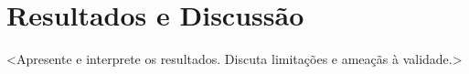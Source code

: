 \section{Resultados e Discuss\~ao}
\label{sec:resultados}

<Apresente e interprete os resultados. Discuta limita\c{c}\~oes e amea\c{c}\~as \`a validade.>


